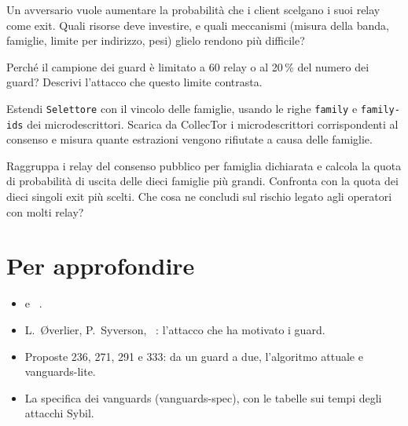 \begin{esercizio}[2]\label{es:13-sybil}
Un avversario vuole aumentare la probabilità che i client scelgano i suoi relay come exit. Quali risorse deve investire, e quali meccanismi (misura della banda, famiglie, limite per indirizzo, pesi) glielo rendono più difficile?
\end{esercizio}

\begin{esercizio}[2]\label{es:13-campione}
Perché il campione dei guard è limitato a 60 relay o al 20\,\% del numero dei guard? Descrivi l'attacco che questo limite contrasta.
\end{esercizio}

\begin{esercizio}[3]\label{es:13-famiglie}
Estendi \texttt{Selettore} con il vincolo delle famiglie, usando le righe \texttt{family} e \texttt{family-ids} dei microdescrittori. Scarica da CollecTor i microdescrittori corrispondenti al consenso e misura quante estrazioni vengono rifiutate a causa delle famiglie.
\end{esercizio}

\begin{esercizio}[3]\label{es:13-operatori}
Raggruppa i relay del consenso pubblico per famiglia dichiarata e calcola la quota di probabilità di uscita delle dieci famiglie più grandi. Confronta con la quota dei dieci singoli exit più scelti. Che cosa ne concludi sul rischio legato agli operatori con molti relay?
\end{esercizio}

\section*{Per approfondire}
\begin{itemize}
  \item {} e ~\cite{torspec}.
  \item L.~Øverlier, P.~Syverson, ~\cite{overlier2006locating}: l'attacco che ha motivato i guard.
  \item Proposte 236, 271, 291 e 333: da un guard a due, l'algoritmo attuale e vanguards-lite.
  \item La specifica dei vanguards (vanguards-spec), con le tabelle sui tempi degli attacchi Sybil.
\end{itemize}
